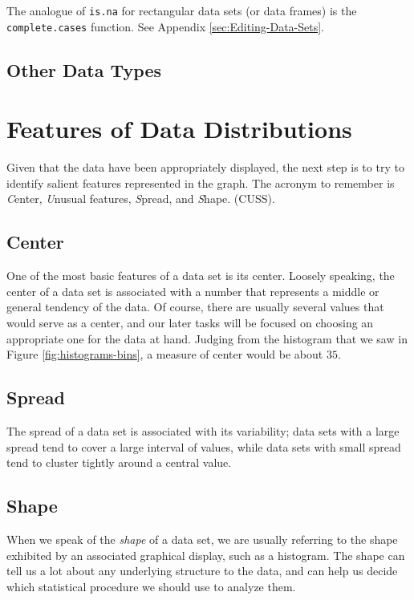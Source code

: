\documentclass[captions=tableheading]{scrbook}
\begin{document}
The analogue of \texttt{is.na} for rectangular data sets (or data frames) is the \texttt{complete.cases} function. See Appendix \ref{sec:Editing-Data-Sets}.
\subsection{Other Data Types}
\label{sec-2-1-7}
\label{sub:other-data-types}
\section{Features of Data Distributions}
\label{sec-2-2}
\label{sec:features-of-data}


Given that the data have been appropriately displayed, the next step is to try to identify salient features represented in the graph. The acronym to remember is \emph{C}enter, \emph{U}nusual features, \emph{S}pread, and \emph{S}hape. (CUSS).
\subsection{Center}
\label{sec-2-2-1}
\label{sub:Center}


One of the most basic features of a data set is its center. Loosely speaking, the center of a data set is associated with a number that represents a middle or general tendency of the data. Of course, there are usually several values that would serve as a center, and our later tasks will be focused on choosing an appropriate one for the data at hand. Judging from the histogram that we saw in Figure \ref{fig:histograms-bins}, a measure of center would be about \(  35 \). 
\subsection{Spread}
\label{sec-2-2-2}
\label{sub:Spread}


The spread of a data set is associated with its variability; data sets with a large spread tend to cover a large interval of values, while data sets with small spread tend to cluster tightly around a central value. 
\subsection{Shape}
\label{sec-2-2-3}
\label{sub:Shape}


When we speak of the \emph{shape} of a data set, we are usually referring to the shape exhibited by an associated graphical display, such as a histogram. The shape can tell us a lot about any underlying structure to the data, and can help us decide which statistical procedure we should use to analyze them.
\end{document}
